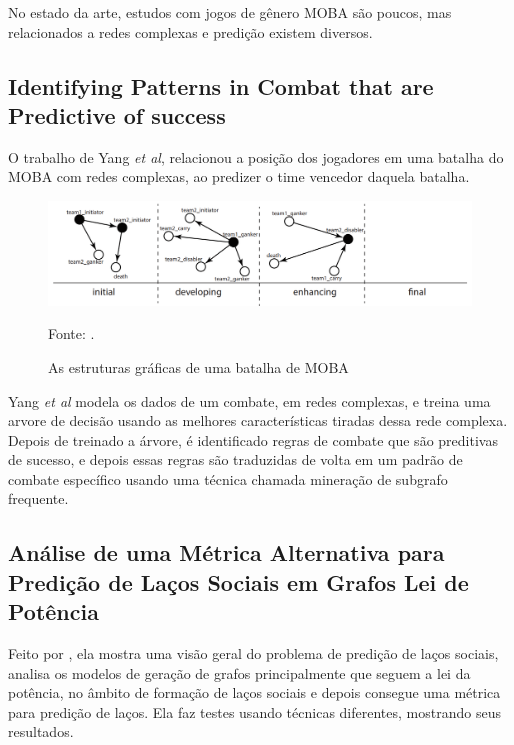 No estado da arte, estudos com jogos de gênero MOBA são poucos, mas relacionados a redes complexas e predição existem diversos.

\subsection{Identifying Patterns in Combat that are Predictive of success}
 O trabalho de Yang \textit{et al}, relacionou a posição dos jogadores em uma batalha do MOBA com redes complexas, ao predizer o time vencedor daquela batalha.

\begin{figure}[!ht]
	\caption{As estruturas gráficas de uma batalha de MOBA}
	\begin{center}
		\includegraphics[width=15cm]{imagens/yang.PNG}
	\end{center}
	\small{Fonte: \cite{Yang2014}.}
	\label{fig:yang2014}
\end{figure}

Yang \textit{et al} modela os dados de um combate, em redes complexas, e treina uma arvore de decisão usando as melhores características tiradas dessa rede complexa. Depois de treinado a árvore, é identificado regras de combate que são preditivas de sucesso, e depois essas regras são traduzidas de volta em um padrão de combate específico usando uma técnica chamada mineração de subgrafo frequente.

\subsection{Análise de uma Métrica Alternativa para Predição de Laços Sociais em Grafos Lei de Potência}

Feito por \citeauthor{Danielewicz2016}, ela mostra uma visão geral do problema de predição de laços sociais, analisa os modelos de geração de grafos principalmente que seguem a lei da potência, no âmbito de formação de laços sociais e depois consegue uma métrica para predição de laços. Ela faz testes usando técnicas diferentes, mostrando seus resultados.